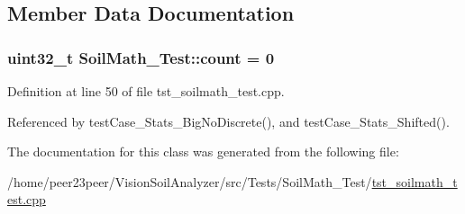 \subsection{Member Data Documentation}
\hypertarget{class_soil_math___test_a693af150765ec63434f414f36e27b91e}{}
\subsubsection[{count}]{\setlength{\rightskip}{0pt plus 5cm}uint32\+\_\+t Soil\+Math\+\_\+\+Test\+::count = 0\hspace{0.3cm}{\ttfamily [private]}}\label{class_soil_math___test_a693af150765ec63434f414f36e27b91e}


Definition at line 50 of file tst\+\_\+soilmath\+\_\+test.\+cpp.



Referenced by test\+Case\+\_\+\+Stats\+\_\+\+Big\+No\+Discrete(), and test\+Case\+\_\+\+Stats\+\_\+\+Shifted().



The documentation for this class was generated from the following file\+:\begin{DoxyCompactItemize}
\item 
/home/peer23peer/\+Vision\+Soil\+Analyzer/src/\+Tests/\+Soil\+Math\+\_\+\+Test/\hyperlink{tst__soilmath__test_8cpp}{tst\+\_\+soilmath\+\_\+test.\+cpp}\end{DoxyCompactItemize}
